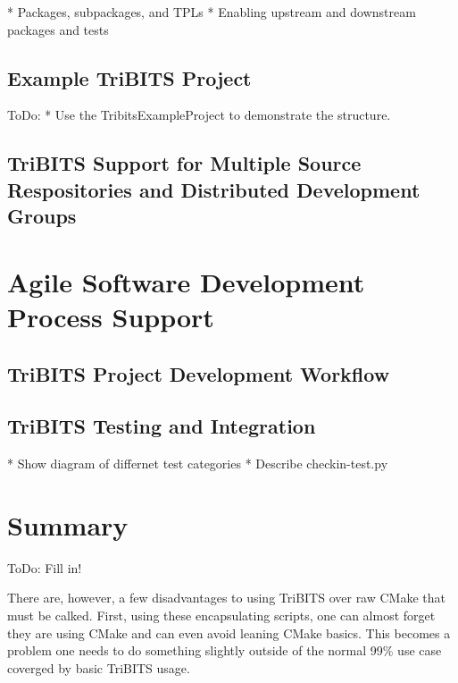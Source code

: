 \documentclass[note]{TechNote}
\begin{document}
* Packages, subpackages, and TPLs
* Enabling upstream and downstream packages and tests

%
\subsection{Example TriBITS Project}
%

ToDo:
* Use the TribitsExampleProject to demonstrate the structure.


%
\subsection{TriBITS Support for Multiple Source Respositories and Distributed Development Groups}
%


%
\section{Agile Software Development Process Support}
%


%
\subsection{TriBITS Project Development Workflow}
%


%
\subsection{TriBITS Testing and Integration}
%

* Show diagram of differnet test categories
* Describe checkin-test.py


%
\section{Summary}
%

ToDo: Fill in!

There are, however, a few disadvantages to using TriBITS over raw CMake that must be calked.  First, using these encapsulating scripts, one can almost forget they are using CMake and can even avoid leaning CMake basics.  This becomes a problem one needs to do something slightly outside of the normal 99\% use case coverged by basic TriBITS usage.





\closing
\caution
\end{document}
